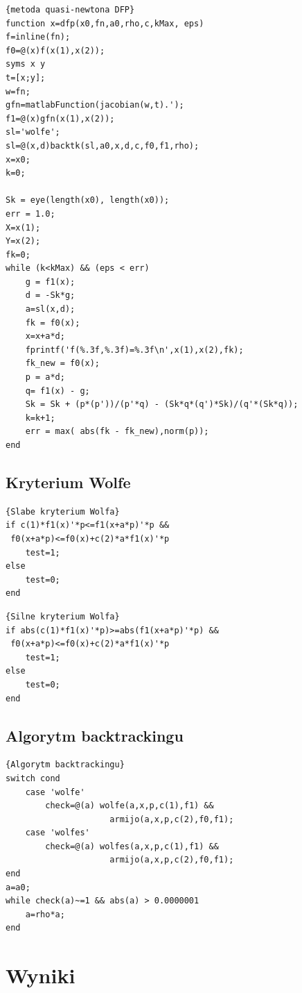 \documentclass{classrep}
\begin{document}
\begin{lstlisting}{metoda quasi-newtona DFP}
function x=dfp(x0,fn,a0,rho,c,kMax, eps)
f=inline(fn);
f0=@(x)f(x(1),x(2));
syms x y
t=[x;y];
w=fn;
gfn=matlabFunction(jacobian(w,t).');
f1=@(x)gfn(x(1),x(2));
sl='wolfe';
sl=@(x,d)backtk(sl,a0,x,d,c,f0,f1,rho);
x=x0;
k=0;

Sk = eye(length(x0), length(x0));
err = 1.0;
X=x(1);
Y=x(2);
fk=0;
while (k<kMax) && (eps < err)
    g = f1(x);
    d = -Sk*g;
    a=sl(x,d);
    fk = f0(x);
    x=x+a*d;
    fprintf('f(%.3f,%.3f)=%.3f\n',x(1),x(2),fk);
    fk_new = f0(x);
    p = a*d;
    q= f1(x) - g;
    Sk = Sk + (p*(p'))/(p'*q) - (Sk*q*(q')*Sk)/(q'*(Sk*q)); 
    k=k+1;
    err = max( abs(fk - fk_new),norm(p));
end
\end{lstlisting}

\subsection{Kryterium Wolfe}

\begin{lstlisting}{Slabe kryterium Wolfa}
if c(1)*f1(x)'*p<=f1(x+a*p)'*p &&
 f0(x+a*p)<=f0(x)+c(2)*a*f1(x)'*p
    test=1;
else 
    test=0;
end
\end{lstlisting}

\begin{lstlisting}{Silne kryterium Wolfa}
if abs(c(1)*f1(x)'*p)>=abs(f1(x+a*p)'*p) &&
 f0(x+a*p)<=f0(x)+c(2)*a*f1(x)'*p
    test=1;
else 
    test=0;
end
\end{lstlisting}



\subsection{Algorytm backtrackingu}

\begin{lstlisting}{Algorytm backtrackingu}
switch cond
    case 'wolfe'
        check=@(a) wolfe(a,x,p,c(1),f1) &&
        			 armijo(a,x,p,c(2),f0,f1);
    case 'wolfes'
        check=@(a) wolfes(a,x,p,c(1),f1) &&
        			 armijo(a,x,p,c(2),f0,f1);
end
a=a0;
while check(a)~=1 && abs(a) > 0.0000001
    a=rho*a;
end

\end{lstlisting}


\section{Wyniki}
\end{document}
